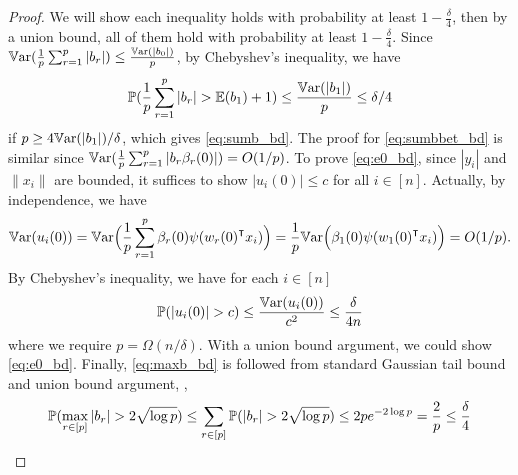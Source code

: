 \begin{proof}
We will show each inequality holds with probability at least $1-\frac{\delta}{4}$, then by a union bound, all of them hold with probability at least $1-\frac{\delta}{4}$. Since $\mathbb{V}\mathrm{ar}(\frac{1}{p}\sum_{r=1}^p|b_r|)\leq \frac{\mathbb{V}\mathrm{ar}(|b_0|)}{p}$, by Chebyshev's inequality, we have
\begin{equation*}
    \operatorname{\mathbb{P}}(\frac{1}{p}\sum_{r=1}^p|b_r| > \mathbb{E}(b_1) + 1) \leq \frac{\mathbb{V}\mathrm{ar}(|b_1|)}{p} \leq \delta/4
\end{equation*}
if $p\geq 4\mathbb{V}\mathrm{ar}(|b_1|)/\delta$, which gives \eqref{eq:sumb_bd}. The proof for \eqref{eq:sumbbet_bd} is similar since $\mathbb{V}\mathrm{ar}(\frac{1}{p}\sum_{r=1}^p|b_r\beta_r(0)|)=O(1/p)$. To prove \eqref{eq:e0_bd}, since $|y_i|$ and $\|x_i\|$ are bounded, it suffices to show $|u_i(0)|\leq c$ for all $i\in [n]$. Actually, by independence, we have
\begin{equation*}
    \Var(u_i(0)) = \Var \Big(\frac{1}{p}\sum_{r=1}^p \beta_r(0)\psi(w_r(0)\transpose x_i)\Big) = \frac{1}{p}\Var\Big(\beta_1(0)\psi(w_1(0)\transpose x_i)\Big) = O(1/p).
\end{equation*}
By Chebyshev's inequality, we have for each $i\in [n]$
\begin{equation*}
    \prob(|u_i(0)|> c) \leq \frac{\Var(u_i(0))}{c^2} \leq \frac{\delta}{4n}
\end{equation*}
where we require $p=\Omega(n/\delta)$. With a union bound argument, we could show \eqref{eq:e0_bd}. Finally, \eqref{eq:maxb_bd} is followed from standard Gaussian tail bound and union bound argument, \ie,
\begin{equation*}
    \operatorname{\mathbb{P}}(\max_{r\in[p]}|b_r| > 2\sqrt{\log p}) \leq \sum_{r\in [p]}\operatorname{\mathbb{P}}(|b_r| > 2\sqrt{\log p}) \leq 2pe^{-2\log p} = \frac{2}{p} \leq \frac{\delta}{4}
\end{equation*}
\end{proof}

